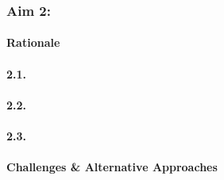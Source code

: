 \subsubsection{Aim 2: \SpecificAimTwo}

\paragraph{Rationale}

\lipsum[1-1]

\paragraph{2.1. \SpecificAimTwoA}

\lipsum[2-2]

\paragraph{2.2. \SpecificAimTwoB}

\lipsum[3-3]

\paragraph{2.3. \SpecificAimTwoC}

\lipsum[4-4]

\paragraph{Challenges \& Alternative Approaches}

\lipsum[5-5]
